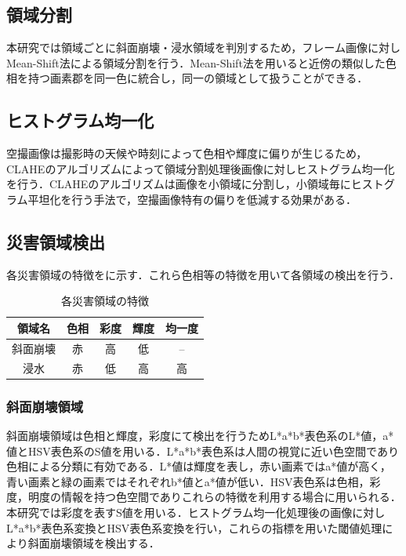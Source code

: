\documentclass[a4paper, twocolumn, xelatex, 9pt, ja=standard, Ligatures=TeX]{bxjsarticle}
\begin{document}
\subsection{領域分割}
	本研究では領域ごとに斜面崩壊・浸水領域を判別するため，フレーム画像に対しMean-Shift法による領域分割を行う．Mean-Shift法を用いると近傍の類似した色相を持つ画素郡を同一色に統合し，同一の領域として扱うことができる．

\subsection{ヒストグラム均一化}
	空撮画像は撮影時の天候や時刻によって色相や輝度に偏りが生じるため，CLAHEのアルゴリズムによって領域分割処理後画像に対しヒストグラム均一化を行う．CLAHEのアルゴリズムは画像を小領域に分割し，小領域毎にヒストグラム平坦化を行う手法で，空撮画像特有の偏りを低減する効果がある．
	
\subsection{災害領域検出}
	各災害領域の特徴をに示す．これら色相等の特徴を用いて各領域の検出を行う．

	\begin{table}[h]
		\centering
		\caption{各災害領域の特徴}
		\label{tab01}
		\begin{tabular}{c c c c c}
			\hline
			領域名 & 色相 & 彩度 & 輝度 & 均一度 \\
			\hline
			\hline
			斜面崩壊 & 赤 & 高 & 低 & -- \\
			浸水 & 赤 & 低 & 高 & 高 \\ \hline
		\end{tabular}
	\end{table}

	\subsubsection{斜面崩壊領域}
		斜面崩壊領域は色相と輝度，彩度にて検出を行うためL*a*b*表色系のL*値，a*値とHSV表色系のS値を用いる．L*a*b*表色系は人間の視覚に近い色空間であり色相による分類に有効である．L*値は輝度を表し，赤い画素ではa*値が高く，青い画素と緑の画素ではそれぞれb*値とa*値が低い．HSV表色系は色相，彩度，明度の情報を持つ色空間でありこれらの特徴を利用する場合に用いられる．本研究では彩度を表すS値を用いる．ヒストグラム均一化処理後の画像に対しL*a*b*表色系変換とHSV表色系変換を行い，これらの指標を用いた閾値処理により斜面崩壊領域を検出する．
		
\end{document}

